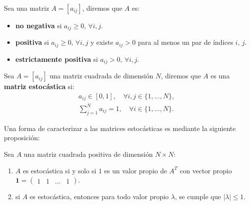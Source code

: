\begin{definition}
    Sea una matriz $A=[a_{ij}]$, diremos que $A$ es:
    \begin{itemize}
        \item \textbf{no negativa} si $a_{ij}\geq 0,\, \forall i,j$.
        \item \textbf{positiva} si $a_{ij}\geq 0,\, \forall i,j$ y existe $a_{ij}>0$ para al menos un par de índices $i,\,j$.
        \item \textbf{estrictamente positiva} si $a_{ij}> 0,\, \forall i,j$.
    \end{itemize}
\end{definition}

\begin{definition}
    Sea $A=[a_{ij}]$ una matriz cuadrada de dimensión $N$, diremos que $A$ es una \textbf{matriz estocástica} si:
    \[
    \begin{aligned}
    a_{ij}\in[0,1],\quad \forall i,j \in \{1,...,N\},\\
    \sum_{j=1}^N a_{ij}=1, \quad \forall i\in\{1,...,N\}.
    \end{aligned}
    \]
\end{definition}

Una forma de caracterizar a las matrices estocásticas es mediante la siguiente proposición:

\begin{proposition}\label{propiedadMatrizEstocástica}
Sea $A$ una matriz cuadrada positiva de dimensión $N\times N$:
\begin{enumerate}
    \item $A$ es estocástica si y solo si $1$ es un valor propio de $A^T$ con vector propio $\mathbf{1}=\begin{pmatrix}1 & 1 & \dots & 1\end{pmatrix}$.
    \item si $A$ es estocástica, entonces para todo valor propio $\lambda$, se cumple que  $\left|\lambda\right|\leq1.$
\end{enumerate}
\end{proposition}

